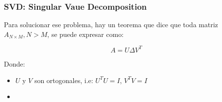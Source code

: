 \subsubsection{SVD: Singular Vaue Decomposition}
 Para solucionar ese problema, hay un teorema que dice que toda matriz $A_{N\times M}, N > M$, se puede expresar como:

 \begin{equation*}
   A = U\Delta V^T
 \end{equation*}

 Donde:

 \begin{itemize}
   \item $U$ y $V$ son ortogonales, i.e: $U^TU = I$, $V^TV = I$
   \item
 \end{itemize}
